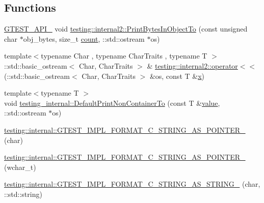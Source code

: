 \subsection*{Functions}
\begin{DoxyCompactItemize}
\item 
\mbox{\hyperlink{_obj__test_2lib_2googletest-release-1_88_81_2googletest_2include_2gtest_2internal_2gtest-port_8h_aa73be6f0ba4a7456180a94904ce17790}{G\+T\+E\+S\+T\+\_\+\+A\+P\+I\+\_\+}} void \mbox{\hyperlink{namespacetesting_1_1internal2_a9fbf8e07c0f94dc74d6ef5e56cd3c553}{testing\+::internal2\+::\+Print\+Bytes\+In\+Object\+To}} (const unsigned char $\ast$obj\+\_\+bytes, size\+\_\+t \mbox{\hyperlink{_obj__test_2lib_2googletest-release-1_88_81_2googlemock_2test_2gmock__stress__test_8cc_afd9db40e3361ae09188795e8cbe19752}{count}}, \+::std\+::ostream $\ast$os)
\item 
{\footnotesize template$<$typename Char , typename Char\+Traits , typename T $>$ }\\\+::std\+::basic\+\_\+ostream$<$ Char, Char\+Traits $>$ \& \mbox{\hyperlink{namespacetesting_1_1internal2_a07dbe129beb8952074f04b599dfce39b}{testing\+::internal2\+::operator$<$$<$}} (\+::std\+::basic\+\_\+ostream$<$ Char, Char\+Traits $>$ \&os, const T \&\mbox{\hyperlink{_obj__test_2lib_2googletest-master_2googlemock_2test_2gmock-matchers__test_8cc_a6150e0515f7202e2fb518f7206ed97dc}{x}})
\item 
{\footnotesize template$<$typename T $>$ }\\void \mbox{\hyperlink{namespacetesting__internal_a3f49d3d0c996242f9d383c850097a656}{testing\+\_\+internal\+::\+Default\+Print\+Non\+Container\+To}} (const T \&\mbox{\hyperlink{_obj__test_2lib_2googletest-master_2googlemock_2test_2gmock-matchers__test_8cc_a337b8a670efc0b086ad3af163f3121b6}{value}}, \+::std\+::ostream $\ast$os)
\item 
\mbox{\hyperlink{namespacetesting_1_1internal_a3682f962ae0ec1c0eca6444ca0a09e91}{testing\+::internal\+::\+G\+T\+E\+S\+T\+\_\+\+I\+M\+P\+L\+\_\+\+F\+O\+R\+M\+A\+T\+\_\+\+C\+\_\+\+S\+T\+R\+I\+N\+G\+\_\+\+A\+S\+\_\+\+P\+O\+I\+N\+T\+E\+R\+\_\+}} (char)
\item 
\mbox{\hyperlink{namespacetesting_1_1internal_a85e08f00d443221e529a0a85a90fbaeb}{testing\+::internal\+::\+G\+T\+E\+S\+T\+\_\+\+I\+M\+P\+L\+\_\+\+F\+O\+R\+M\+A\+T\+\_\+\+C\+\_\+\+S\+T\+R\+I\+N\+G\+\_\+\+A\+S\+\_\+\+P\+O\+I\+N\+T\+E\+R\+\_\+}} (wchar\+\_\+t)
\item 
\mbox{\hyperlink{namespacetesting_1_1internal_aeac30230dcc362221bdd07d61eaa4ec1}{testing\+::internal\+::\+G\+T\+E\+S\+T\+\_\+\+I\+M\+P\+L\+\_\+\+F\+O\+R\+M\+A\+T\+\_\+\+C\+\_\+\+S\+T\+R\+I\+N\+G\+\_\+\+A\+S\+\_\+\+S\+T\+R\+I\+N\+G\+\_\+}} (char, \+::std\+::string)

\end{DoxyCompactItemize}
